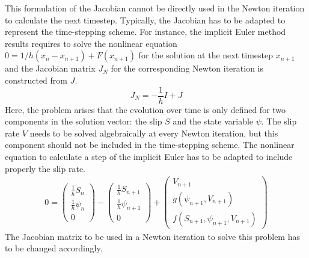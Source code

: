 This formulation of the Jacobian cannot be directly used in the Newton iteration to calculate the next timestep. Typically, the Jacobian has to be adapted to represent the time-stepping scheme. For instance, the implicit Euler method results requires to solve the nonlinear equation $0 = 1/h(x_n - x_{n+1}) + F(x_{n+1})$ for the solution at the next timestep $x_{n+1}$ and the Jacobian matrix $J_N$ for the corresponding Newton iteration is constructed from $J$. 
\begin{equation}
J_N = -\frac{1}{h}I + J
\end{equation}
Here, the problem arises that the evolution over time is only defined for two components in the solution vector: the slip $S$ and the state variable $\psi$. The slip rate $V$ needs to be solved algebraically at every Newton iteration, but this component should not be included in the time-stepping scheme. The nonlinear equation to calculate a step of the implicit Euler has to be adapted to include properly the slip rate. 
\begin{align}
0 = \begin{pmatrix} \frac{1}{h}S_n     \\ \frac{1}{h}\psi_n     \\ 0 \end{pmatrix} - 
\begin{pmatrix} \frac{1}{h}S_{n+1} \\ \frac{1}{h}\psi_{n+1} \\ 0 \end{pmatrix} + 
\begin{pmatrix} V_{n+1}            \\ g(\psi_{n+1},V_{n+1}) \\ f(S_{n+1}, \psi_{n+1}, V_{n+1}) \end{pmatrix}
\end{align}
The Jacobian matrix to be used in a Newton iteration to solve this problem has to be changed accordingly.
